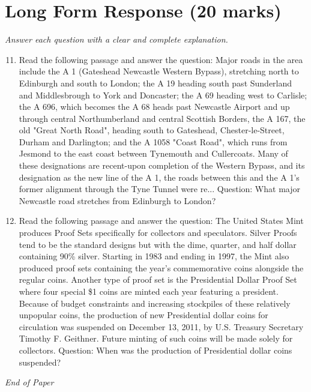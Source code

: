 \documentclass[12pt]{article}
\begin{document}
\section*{Long Form Response (20 marks)}
\textit{Answer each question with a clear and complete explanation.}
\begin{enumerate}[label=\arabic*.]
\setcounter{enumi}{10}
\item Read the following passage and answer the question: Major roads in the area include the A 1 (Gateshead Newcastle Western Bypass), stretching north to Edinburgh and south to London; the A 19 heading south past Sunderland and Middlesbrough to York and Doncaster; the A 69 heading west to Carlisle; the A 696, which becomes the A 68 heads past Newcastle Airport and up through central Northumberland and central Scottish Borders, the A 167, the old "Great North Road", heading south to Gateshead, Chester-le-Street, Durham and Darlington; and the A 1058 "Coast Road", which runs from Jesmond to the east coast between Tynemouth and Cullercoats. Many of these designations are recent-upon completion of the Western Bypass, and its designation as the new line of the A 1, the roads between this and the A 1's former alignment through the Tyne Tunnel were re... Question: What major Newcastle road stretches from Edinburgh to London?
\item Read the following passage and answer the question: The United States Mint produces Proof Sets specifically for collectors and speculators. Silver Proofs tend to be the standard designs but with the dime, quarter, and half dollar containing 90\% silver. Starting in 1983 and ending in 1997, the Mint also produced proof sets containing the year's commemorative coins alongside the regular coins. Another type of proof set is the Presidential Dollar Proof Set where four special \$1 coins are minted each year featuring a president. Because of budget constraints and increasing stockpiles of these relatively unpopular coins, the production of new Presidential dollar coins for circulation was suspended on December 13, 2011, by U.S. Treasury Secretary Timothy F. Geithner. Future minting of such coins will be made solely for collectors. Question: When was the production of Presidential dollar coins suspended?
\end{enumerate}

\vfill
\noindent\textit{End of Paper}
\end{document}
